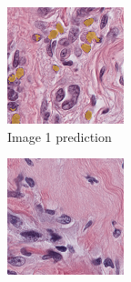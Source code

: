 \begin{figure}[H]
  \centering
  \begin{subfigure}[b]{0.32\textwidth}
    \centering
    \includegraphics[width=\linewidth]{assets/images/for_presentation/exp2-1-pred.png}
    \caption{Image 1 prediction}
  \end{subfigure}\hfill
  \begin{subfigure}[b]{0.32\textwidth}
    \centering
    \includegraphics[width=\linewidth]{assets/images/for_presentation/exp-2-2-pred.png}

\end{subfigure}
\end{figure}
